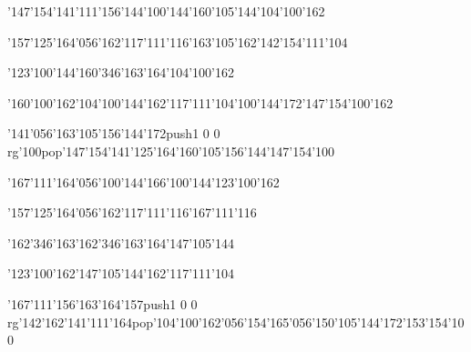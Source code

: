 \null\vfill\ipa\centerline{\enskip\char'147\char'154\char'141\char'111\char'156\char'144\enskip\enskip\enskip\enskip\enskip\enskip\enskip\char'100\char'144\enskip\enskip\enskip\char'160\char'105\char'144\enskip\char'104\char'100\char'162}\medskip\centerline{\enskip\char'157\char'125\char'164\char'056\char'162\char'117\char'111\char'116\enskip\enskip\enskip\enskip\char'163\char'105\char'162\enskip\enskip\enskip\enskip\enskip\char'142\char'154\char'111\char'104}\medskip\centerline{\enskip\char'123\char'100\char'144\enskip\enskip\enskip\enskip\char'160\char'346\char'163\char'164\enskip\enskip\enskip\char'104\char'100\char'162}\medskip\centerline{\enskip\enskip\enskip\enskip\char'160\char'100\char'162\enskip\char'104\char'100\char'144\enskip\char'162\char'117\char'111\char'104\enskip\char'100\char'144\char'172\enskip\char'147\char'154\char'100\char'162}\medskip\centerline{\enskip\char'141\char'056\char'163\char'105\char'156\char'144\char'172\enskip\pdfcolorstack\match push{1 0 0 rg}\char'100\pdfcolorstack\match pop{}\enskip\char'147\char'154\char'141\char'125\char'164\enskip\enskip\enskip\enskip\enskip\enskip\char'160\char'105\char'156\char'144\enskip\char'147\char'154\char'100}\medskip\vfill\footline{\hfil\tt\folio\hfil}\eject
\null\vfill\ipa\centerline{\enskip\enskip\enskip\enskip\enskip\enskip\enskip\enskip\enskip\enskip\enskip\char'167\char'111\char'164\char'056\char'100\char'144\enskip\enskip\enskip\char'166\char'100\char'144\enskip\char'123\char'100\char'162}\medskip\centerline{\enskip\char'157\char'125\char'164\char'056\char'162\char'117\char'111\char'116\enskip\enskip\enskip\enskip\char'167\char'111\char'116\enskip\enskip\enskip\enskip\enskip\enskip\enskip\enskip\enskip}\medskip\centerline{\enskip\char'162\char'346\char'163\enskip\enskip\enskip\enskip\char'162\char'346\char'163\char'164\enskip\enskip\enskip\char'147\char'105\char'144}\medskip\centerline{\enskip\enskip\enskip\enskip\char'123\char'100\char'162\enskip\char'147\char'105\char'144\enskip\char'162\char'117\char'111\char'104\enskip\enskip\enskip\enskip\enskip\enskip\enskip\enskip\enskip}\medskip\centerline{\enskip\enskip\char'167\char'111\char'156\char'163\char'164\enskip\char'157\enskip\pdfcolorstack\match push{1 0 0 rg}\char'142\char'162\char'141\char'111\char'164\pdfcolorstack\match pop{}\enskip\char'104\char'100\char'162\char'056\char'154\char'165\char'056\char'150\char'105\char'144\char'172\enskip\char'153\char'154\char'100}\medskip\vfill\footline{\hfil\tt\folio\hfil}\eject
